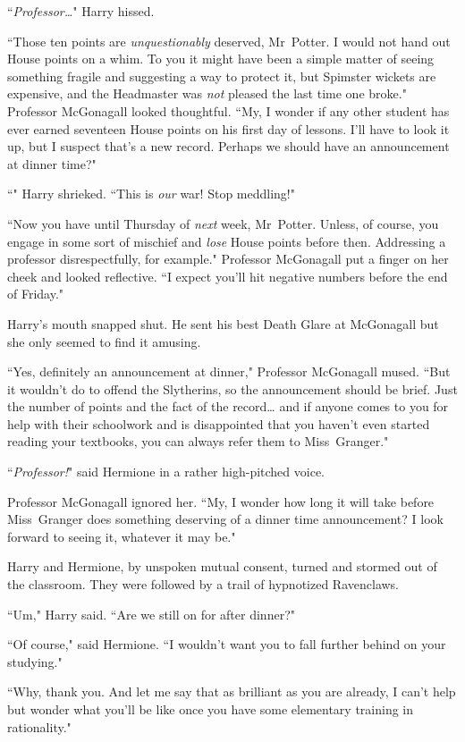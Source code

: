 ``\emph{Professor{\ldots}}" Harry hissed.

``Those ten points are \emph{unquestionably} deserved, Mr~Potter. I would not hand out House points on a whim. To you it might have been a simple matter of seeing something fragile and suggesting a way to protect it, but Spimster wickets are expensive, and the Headmaster was \emph{not} pleased the last time one broke." Professor McGonagall looked thoughtful. ``My, I wonder if any other student has ever earned seventeen House points on his first day of lessons. I'll have to look it up, but I suspect that's a new record. Perhaps we should have an announcement at dinner time?"

``" Harry shrieked. ``This is \emph{our} war! Stop meddling!"

``Now you have until Thursday of \emph{next} week, Mr~Potter. Unless, of course, you engage in some sort of mischief and \emph{lose} House points before then. Addressing a professor disrespectfully, for example." Professor McGonagall put a finger on her cheek and looked reflective. ``I expect you'll hit negative numbers before the end of Friday."

Harry's mouth snapped shut. He sent his best Death Glare at McGonagall but she only seemed to find it amusing.

``Yes, definitely an announcement at dinner," Professor McGonagall mused. ``But it wouldn't do to offend the Slytherins, so the announcement should be brief. Just the number of points and the fact of the record{\ldots} and if anyone comes to you for help with their schoolwork and is disappointed that you haven't even started reading your textbooks, you can always refer them to Miss~Granger."

``\emph{Professor!}" said Hermione in a rather high-pitched voice.

Professor McGonagall ignored her. ``My, I wonder how long it will take before Miss~Granger does something deserving of a dinner time announcement? I look forward to seeing it, whatever it may be."

Harry and Hermione, by unspoken mutual consent, turned and stormed out of the classroom. They were followed by a trail of hypnotized Ravenclaws.

``Um," Harry said. ``Are we still on for after dinner?"

``Of course," said Hermione. ``I wouldn't want you to fall further behind on your studying."

``Why, thank you. And let me say that as brilliant as you are already, I can't help but wonder what you'll be like once you have some elementary training in rationality."

